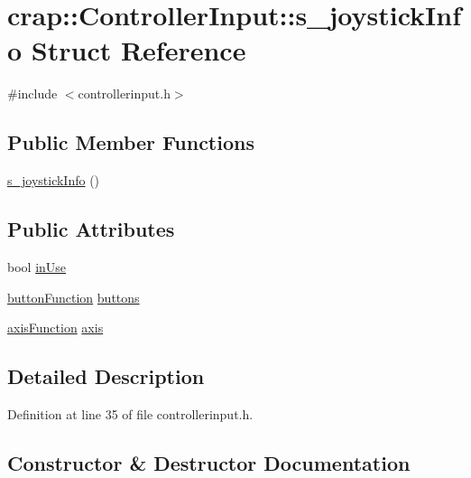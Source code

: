 \hypertarget{structcrap_1_1_controller_input_1_1s__joystick_info}{}\section{crap\+:\+:Controller\+Input\+:\+:s\+\_\+joystick\+Info Struct Reference}
\label{structcrap_1_1_controller_input_1_1s__joystick_info}


{\ttfamily \#include $<$controllerinput.\+h$>$}

\subsection*{Public Member Functions}
\begin{DoxyCompactItemize}
\item 
\hyperlink{structcrap_1_1_controller_input_1_1s__joystick_info_a77709a64b61c871485a9a64d0e92068d}{s\+\_\+joystick\+Info} ()
\end{DoxyCompactItemize}
\subsection*{Public Attributes}
\begin{DoxyCompactItemize}
\item 
bool \hyperlink{structcrap_1_1_controller_input_1_1s__joystick_info_ade0a86285594da76150e65af90aa118b}{in\+Use}
\item 
\hyperlink{classcrap_1_1_controller_input_aeacf05e7418322e48e62ce5dd179c7a8}{button\+Function} \hyperlink{structcrap_1_1_controller_input_1_1s__joystick_info_a580e5110bb5b1864c6eeb40fd133a68b}{buttons}
\item 
\hyperlink{classcrap_1_1_controller_input_aea9c7f407b4c8fb0cea63aa69acccbe1}{axis\+Function} \hyperlink{structcrap_1_1_controller_input_1_1s__joystick_info_a4206a16af18f3f81d6ebeade4850ed1d}{axis}
\end{DoxyCompactItemize}


\subsection{Detailed Description}


Definition at line 35 of file controllerinput.\+h.



\subsection{Constructor \& Destructor Documentation}
\hypertarget{structcrap_1_1_controller_input_1_1s__joystick_info_a77709a64b61c871485a9a64d0e92068d}{}

